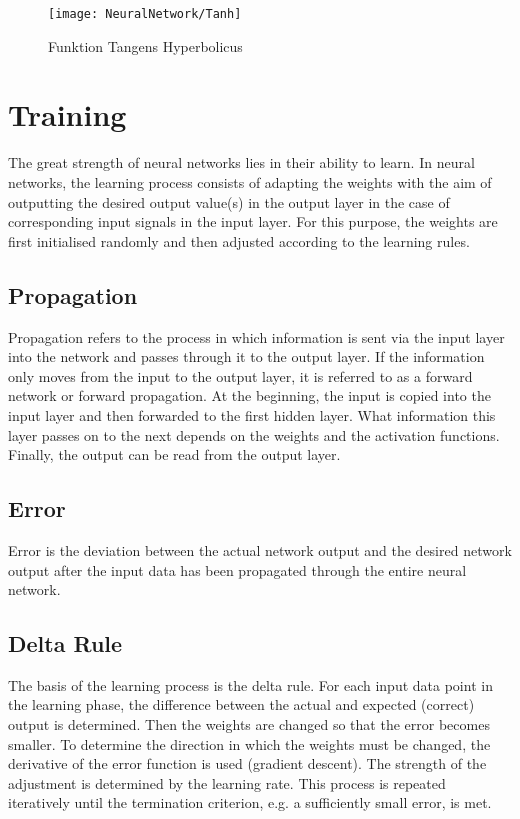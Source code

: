 \begin{figure}[H]
	\begin{center}
	\texttt{[image: NeuralNetwork/Tanh]}
	\caption{Funktion Tangens Hyperbolicus}\label{NNTanh}
	\end{center}
\end{figure}

	
	

\section{Training}%

The great strength of neural networks lies in their ability to learn. In neural networks, the learning process consists of adapting the weights with the aim of outputting the desired output value(s) in the output layer in the case of corresponding input signals in the input layer. For this purpose, the weights are first initialised randomly and then adjusted according to the learning rules.


\subsection{Propagation}

Propagation refers to the process in which information is sent via the input layer into the network and passes through it to the output layer. If the information only moves from the input to the output layer, it is referred to as a forward network or forward propagation. At the beginning, the input is copied into the input layer and then forwarded to the first hidden layer. What information this layer passes on to the next depends on the weights and the activation functions. Finally, the output can be read from the output layer. \cite{Kriesel:2008}


\subsection{Error}

Error is the deviation between the actual network output and the desired network output after the input data has been propagated through the entire neural network. \cite{Kriesel:2008}


\subsection{Delta Rule} 
The basis of the learning process is the delta rule. For each input data point in the learning phase, the difference between the actual and expected (correct) output is determined. Then the weights are changed so that the error becomes smaller. To determine the direction in which the weights must be changed, the derivative of the error function is used (gradient descent). The strength of the adjustment is determined by the learning rate. This process is repeated iteratively until the termination criterion, e.g. a sufficiently small error, is met.\cite{Kononenko:2007}

